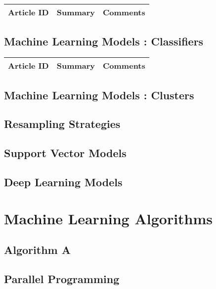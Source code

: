 \begin{table}[H]\centering
	\begin{tabular}{p{1cm}p{4cm}p{3cm}}
		Article ID & Summary & Comments\\
		\hline
		\hline
	\end{tabular}
\end{table}

\subsection{Machine Learning Models : Classifiers}

\begin{table}[H]\centering
	\begin{tabular}{p{1cm}p{4cm}p{3cm}}
		Article ID & Summary & Comments\\
		\hline
		\hline
	\end{tabular}
\end{table}

\subsection{Machine Learning Models : Clusters}

\subsection{Resampling Strategies}

\subsection{Support Vector Models}

\subsection{Deep Learning Models}

\section{Machine Learning Algorithms}

\subsection{Algorithm A}

\subsection{Parallel Programming}

